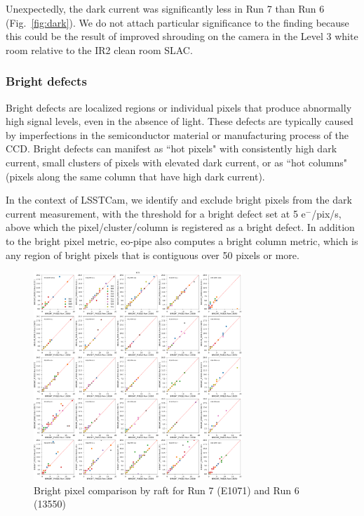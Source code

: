 Unexpectedly, the dark current was significantly less in Run 7 than
Run 6 (Fig.~\ref{fig:dark}). We do not attach particular significance to the finding because this could be the result of improved shrouding on the camera in the Level 3 white room relative to the IR2 clean room SLAC.

\subsubsection{Bright defects}\label{bright-defects}

Bright defects are localized regions or individual pixels that produce abnormally high signal levels, even in the absence of light. These defects are typically caused by imperfections in the semiconductor material or manufacturing process of the CCD. Bright defects can manifest as ``hot pixels" with consistently high dark current, small clusters of pixels with elevated dark current, or as ``hot columns" (pixels along the same column that have high dark current). 

In the context of LSSTCam, we identify and exclude bright pixels from the dark current measurement, with the threshold for a bright defect set at 5 e$^-$/pix/s, above which the pixel/cluster/column is registered as a bright defect. In addition to the bright pixel metric, eo-pipe also computes a bright column metric, which is any region of bright pixels that is contiguous over 50 pixels or more.

\begin{figure}[H]
\begin{centering}
\includegraphics[width=0.7\textwidth]{figures/baselineCharacterization/13550_E1071_BRIGHT_PIXELS_inset.png}
\caption{Bright pixel comparison by raft for Run 7 (E1071) and Run 6 (13550)}
\label{fig:bright}
\end{centering}
\end{figure}

